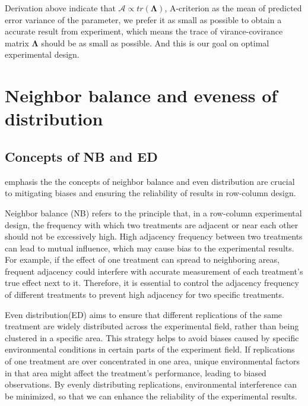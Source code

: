 \documentclass[
  a4paper,
  oneside,
  openany,
  12pt,
  onecolumn]{book}
\theoremstyle{plain}
\theoremstyle{definition}
\theoremstyle{remark}
\begin{document}
Derivation above indicate that
\(\mathscr{A}\propto tr(\boldsymbol{\Lambda})\), A-criterion as the mean
of predicted error variance of the parameter, we prefer it as small as
possible to obtain a accurate result from experiment, which means the
trace of virance-covirance matrix \(\boldsymbol{\Lambda}\) should be as
small as possible. And this is our goal on optimal experimental design.

\section{Neighbor balance and eveness of
distribution}\label{neighbor-balance-and-eveness-of-distribution}

\subsection{Concepts of NB and ED}\label{concepts-of-nb-and-ed}

\citet{piepho2018neighbor} emphasis the the concepts of neighbor balance
and even distribution are crucial to mitigating biases and ensuring the
reliability of results in row-column design.

Neighbor balance (NB) refers to the principle that, in a row-column
experimental design, the frequency with which two treatments are
adjacent or near each other should not be excessively high. High
adjacency frequency between two treatments can lead to mutual influence,
which may cause bias to the experimental results. For example, if the
effect of one treatment can spread to neighboring areas, frequent
adjacency could interfere with accurate measurement of each treatment's
true effect next to it. Therefore, it is essential to control the
adjacency frequency of different treatments to prevent high adjacency
for two specific treatments.

Even distribution(ED) aims to ensure that different replications of the
same treatment are widely distributed across the experimental field,
rather than being clustered in a specific area. This strategy helps to
avoid biases caused by specific environmental conditions in certain
parts of the experiment field. If replications of one treatment are over
concentrated in one area, unique environmental factors in that area
might affect the treatment's performance, leading to biased
observations. By evenly distributing replications, environmental
interference can be minimized, so that we can enhance the reliability of
the experimental results.
\end{document}
